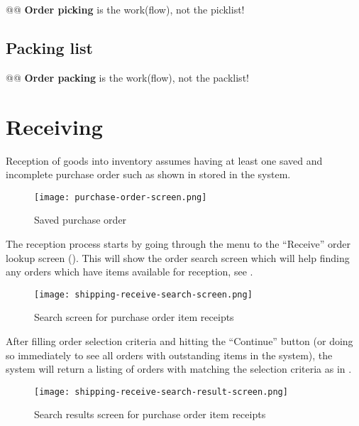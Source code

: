 @@ \textbf{Order picking} is the work(flow), not the picklist!

\subsection{Packing list}
\label{subsec-workflows-inventory-shipping-packlist}

@@ \textbf{Order packing} is the work(flow), not the packlist!

\section{Receiving}
\label{sec-workflows-inventory-receiving}


Reception of goods into inventory assumes having at least one
saved and incomplete purchase order such as shown in
 stored in the system.

\begin{figure}[h]
\centering
\texttt{[image: purchase-order-screen.png]}
\caption{Saved purchase order}
\label{fig:purchase-order-screen}
\end{figure}

The reception process starts by going through the menu to the
``Receive'' order lookup screen ().
This will show the order search screen which will help finding
any orders which have items available for reception, see .


\begin{figure}[h]
\centering
\texttt{[image: shipping-receive-search-screen.png]}
\caption{Search screen for purchase order item receipts}
\label{fig:shipping-receive-search-screen}
\end{figure}

After filling order selection criteria and hitting the ``Continue'' button (or doing so
immediately to see all orders with outstanding items in the system), the system will return
a listing of orders with matching the selection criteria as in .

\begin{figure}[h]
\centering
\texttt{[image: shipping-receive-search-result-screen.png]}
\caption{Search results screen for purchase order item receipts}
\label{fig:shipping-receive-search-result-screen}
\end{figure}

